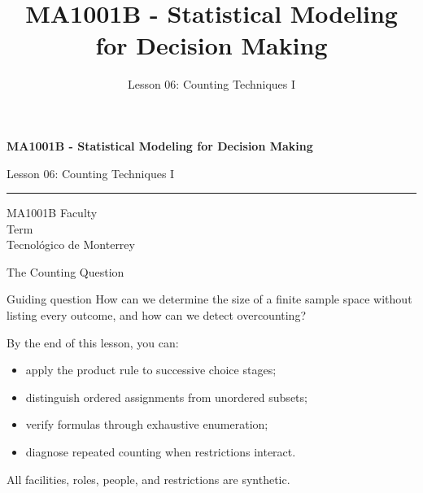 \documentclass[aspectratio=169,10pt,english]{beamer}
\title{MA1001B - Statistical Modeling for Decision Making}
\subtitle{Lesson 06: Counting Techniques I}
\author{}
\institute{Tecnol\'ogico de Monterrey}
\date{}
\begin{document}
\begin{frame}[plain]
  \vspace{1.2cm}
  {\Large\bfseries MA1001B - Statistical Modeling for Decision Making\par}
  \vspace{0.7cm}
  {\large Lesson 06: Counting Techniques I\par}
  \vspace{0.7cm}
  {\color{TecRojo}\rule{\textwidth}{1.2pt}}
  \vspace{0.8cm}

  MA1001B Faculty\\[0.3cm]
  Term\\[0.3cm]
  Tecnol\'ogico de Monterrey
\end{frame}

\begin{frame}{The Counting Question}
  \begin{alertblock}{Guiding question}
    How can we determine the size of a finite sample space without listing every
    outcome, and how can we detect overcounting?
  \end{alertblock}

  \vspace{0.5em}
  By the end of this lesson, you can:
  \begin{itemize}
    \item apply the product rule to successive choice stages;
    \item distinguish ordered assignments from unordered subsets;
    \item verify formulas through exhaustive enumeration;
    \item diagnose repeated counting when restrictions interact.
  \end{itemize}

  \vfill
  \scriptsize All facilities, roles, people, and restrictions are synthetic.
\end{frame}
\end{document}
